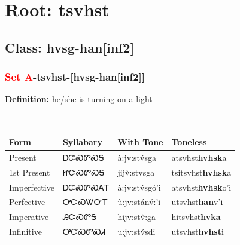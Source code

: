 \needspace{4in}
\section*{Root: tsvhst}
\nopagebreak
{}
\needspace{3in}
\subsection*{Class: hvsg-han[inf2]}
\nopagebreak
\needspace{2in}
\subsubsection*{\textcolor{Red}{Set A}{-}\textbf{tsvhst}{-}[hvsg-han[inf2]]}
\nopagebreak
\textbf{Definition: } he/she is turning on a light
\\[0.5em]
\begin{tabularx}{\textwidth}{l X X X}%
\toprule%
\textbf{Form}&\textbf{Syllabary}&\textbf{With Tone}&\textbf{Toneless}\\%
\midrule%
Present&ᎠᏨᏍᏛᏍᎦ&à:jv:stv́sga&atsvhst\textbf{hvhsk}a\\%
1st Present&ᏥᏨᏍᏛᏍᎦ&jijv̀:stvsga&tsitsvhst\textbf{hvhsk}a\\%
Imperfective&ᎠᏨᏍᏛᏍᎪᎢ&à:jv:stv́sgó’i&atsvhst\textbf{hvhsk}o'i\\%
Perfective&ᎤᏨᏍᏔᏅᎢ&ù:jv:stánv́:’i&utsvhst\textbf{han}v'i\\%
Imperative&ᎯᏨᏍᏛᎦ&hijv:stv̀:ga&hitsvhst\textbf{hvka}\\%
Infinitive&ᎤᏨᏍᏛᏍᏗ&u:jv:stv́sdi&utsvhst\textbf{hvhst}i\\%
\bottomrule%
\end{tabularx}
\\[1em]